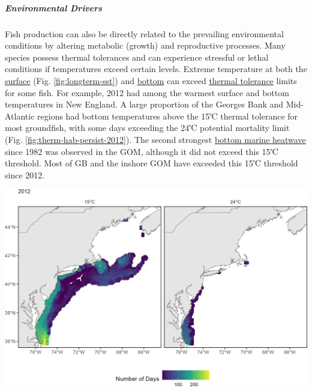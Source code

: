 \documentclass[
  10pt,
]{article}
\let\origfigure\figure
\let\endorigfigure\endfigure
\renewenvironment{figure}[1][2] {
    \expandafter\origfigure\expandafter[H]
} {
    \endorigfigure
}
\begin{document}
\hypertarget{environmental-drivers}{%
\subparagraph{Environmental Drivers}\label{environmental-drivers}}

Fish production can also be directly related to the prevailing environmental conditions by altering metabolic (growth) and reproductive processes. Many species possess thermal tolerances and can experience stressful or lethal conditions if temperatures exceed certain levels. Extreme temperature at both the \href{https://noaa-edab.github.io/catalog/sea-surface-temperature-anomaly.html}{surface} (Fig. \ref{fig:longterm-sst}) and \href{https://noaa-edab.github.io/catalog/bottom-temperature---seasonal-anomaly.html}{bottom} can exceed \href{https://noaa-edab.github.io/catalog/thermal-habitat-persistence.html}{thermal tolerance} limits for some fish. For example, 2012 had among the warmest surface and bottom temperatures in New England. A large proportion of the Georges Bank and Mid-Atlantic regions had bottom temperatures above the 15℃ thermal tolerance for most groundfish, with some days exceeding the 24℃ potential mortality limit (Fig. \ref{fig:therm-hab-persist-2012}). The second strongest \href{https://noaa-edab.github.io/catalog/marine-heatwaves---bottom.html}{bottom marine heatwave} since 1982 was observed in the GOM, although it did not exceed this 15℃ threshold. Most of GB and the inshore GOM have exceeded this 15℃ threshold since 2012.

\begin{figure}

{\centering \includegraphics{SOE-NEFMC_files/figure-latex/therm-hab-persist-2012-1} 

}

\caption{The number of days in 2012 where bottom temperature exceeds 15℃ (left) and 24℃ (right) based on the GLORYS 1/12 degree grid.}\label{fig:therm-hab-persist-2012}
\end{figure}
\end{document}
